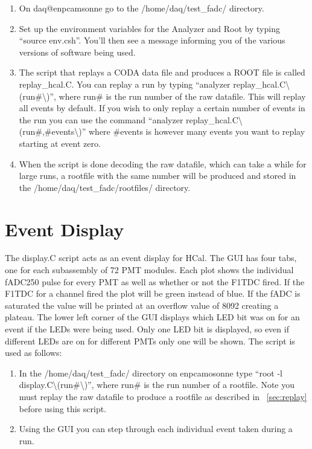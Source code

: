 \documentclass[oneside]{book}   %
\begin{document}
\begin{enumerate}
	\item On daq@enpcamsonne go to the /home/daq/test\_fadc/ directory. 
	\item Set up the environment variables for the Analyzer and Root by typing ``source env.csh''. You'll then see a message informing you of the various versions of software being used. 
	\item The script that replays a CODA data file and produces a ROOT file is called replay\_hcal.C. You can replay a run by typing ``analyzer replay\_hcal.C\textbackslash(run\#\textbackslash)'', where run\# is the run number of the raw datafile. This will replay all events by default. If you wish to only replay a certain number of events in the run you can use the command ``analyzer replay\_hcal.C\textbackslash(run\#,\#events\textbackslash)'' where \#events is however many events you want to replay starting at event zero.
	\item When the script is done decoding the raw datafile, which can take a while for large runs, a rootfile with the same number will be produced and stored in the /home/daq/test\_fadc/rootfiles/ directory.
\end{enumerate}

\section{Event Display}
\label{sec:event_display}

The display.C script acts as an event display for HCal. The GUI has four tabs, one for each subassembly of 72 PMT modules. Each plot shows the individual fADC250 pulse for every PMT as well as whether or not the F1TDC fired. If the F1TDC for a channel fired the plot will be green instead of blue. If the fADC is saturated the value will be printed at an overflow value of 8092 creating a plateau. The lower left corner of the GUI displays which LED bit was on for an event if the LEDs were being used. Only one LED bit is displayed, so even if different LEDs are on for different PMTs only one will be shown. The script is used as follows:

\begin{enumerate}
	\item In the /home/daq/test\_fadc/ directory on enpcamosonne type ``root -l display.C\textbackslash(run\#\textbackslash)'', where run\# is the run number of a rootfile. Note you must replay the raw datafile to produce a rootfile as described in ~\ref{sec:replay} before using this script.
	\item Using the GUI you can step through each individual event taken during a run.
\end{enumerate}
\end{document}
